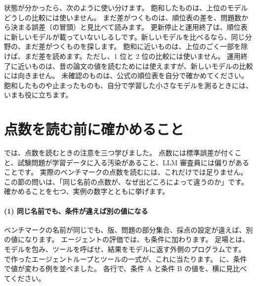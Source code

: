 状態が分かったら、次のように使い分けます。
飽和したものは、上位のモデルどうしの比較には使いません。
まだ差がつくものは、順位表の差を、問題数から決まる誤差（の冒頭）と見比べて読みます。
更新停止と運用終了は、順位表に新しいモデルが載っていないしるしです。新しいモデルを比べるなら、同じ分野の、まだ差がつくものを探します。
飽和に近いものは、上位のごく一部を除けば、まだ差を読めます。ただし、1 位と 2 位の比較には使いません。
運用終了に近いものは、昔の論文の値を読むためには使えますが、新しいモデルの比較には向きません。
未確認のものは、公式の順位表を自分で確かめてください。
飽和したものや止まったものも、自分で学習した小さなモデルを測るときには、いまも役に立ちます。

\section{点数を読む前に確かめること}\label{sec:bm-read}

では、点数を読むときの注意を三つ学びました。
点数には標準誤差が付くこと、試験問題が学習データに入る汚染があること、LLM 審査員には偏りがあることです。
実際のベンチマークの点数を読むには、これだけでは足りません。
この節の問いは、「同じ名前の点数が、なぜ出どころによって違うのか」です。
確かめることを七つ、実例の数字とともに挙げます。

\paragraph{(1) 同じ名前でも、条件が違えば別の値になる}
ベンチマークの名前が同じでも、版、問題の部分集合、採点の設定が違えば、別の値になります。
エージェントの評価では、も条件に加わります。
足場とは、モデルを包み、ツールを呼ばせ、結果をモデルに返す外側のプログラムです。
で作ったエージェントループとツールの一式が、これに当たります。
に、条件で値が変わる例を並べました。
各行で、条件 A と条件 B の値を、横に見比べてください。

